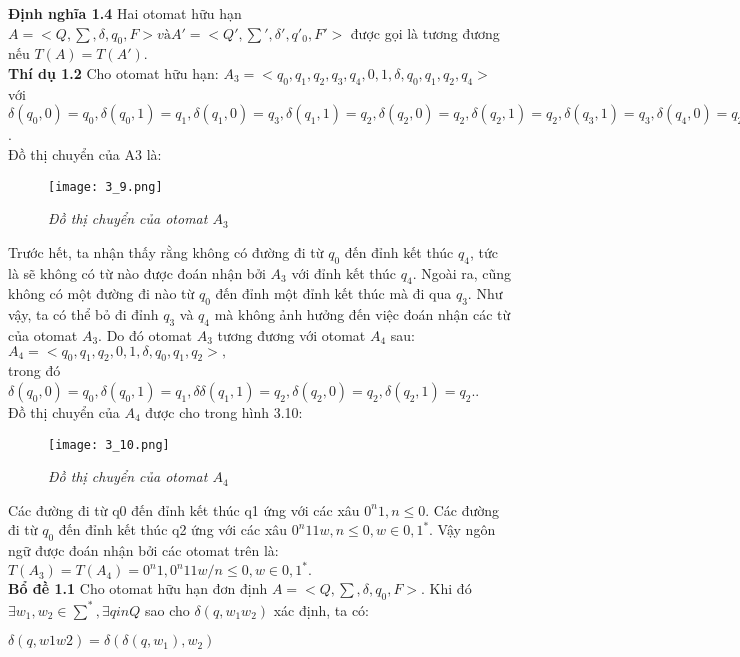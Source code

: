 \begin{flushleft}
\textbf{Định nghĩa 1.4} Hai otomat hữu hạn $A = <Q, \sum, \delta, q_0, F> và A'= <Q', \sum', \delta', q'_0, F'>$ được gọi là tương đương nếu $T(A) = T(A')$.\\
\textbf{Thí dụ 1.2} Cho otomat hữu hạn: $A_3 = <{q_0, q_1, q_2, q_3, q_4},{0, 1}, \delta, q_0, {q_1, q_2, q_4}>$ với $\delta(q_0,0) = q_0, \delta(q_0,1) = q_1, \delta(q_1,0) = q_3, \delta(q_1,1) = q_2, \delta(q_2,0) = q_2, \delta(q_2,1) = q_2, \delta(q_3,1) = q_3, \delta(q_4,0) = q_2, \delta(q_4,1) = q_3.$.\\
\hspace{10mm}Đồ thị chuyển của A3 là:\\
\begin{figure}[ht]
\texttt{[image: 3\_9.png]}
\caption{ \textit{Đồ thị chuyển của otomat $A_3$}}
\end{figure}

Trước hết, ta nhận thấy rằng không có đường đi từ $q_0$ đến đỉnh kết thúc $q_4$, tức là sẽ không có từ nào được đoán nhận bởi $A_3$ với đỉnh kết thúc $q_4$. Ngoài ra, cũng không có một đường đi nào từ $q_0$ đến đỉnh một đỉnh kết thúc mà đi qua $q_3$. Như vậy, ta có thể bỏ đi đỉnh $q_3$ và $q_4$ mà không ảnh hưởng đến việc đoán nhận các từ của otomat $A_3$. Do đó otomat $A_3$ tương đương với otomat $A_4$ sau: \\
$A_4 = <{q_0, q_1, q_2}, {0, 1}, \delta, q_0, {q_1, q_2}>,$\\
trong đó $\delta(q_0,0) = q_0, \delta(q_0,1) = q_1, \delta\delta(q_1,1) = q_2, \delta(q_2,0) = q_2, \delta(q_2,1) = q_2.$.\\
Đồ thị chuyển của $A_4$ được cho trong hình 3.10:\\
\begin{figure}[ht]
\texttt{[image: 3\_10.png]}
\caption{ \textit{Đồ thị chuyển của otomat $A_4$}}
\end{figure}
Các đường đi từ q0 đến đỉnh kết thúc q1 ứng với các xâu $0^n1, n \le 0$. Các đường đi từ $q_0$ đến đỉnh kết thúc q2 ứng với các xâu $0^n11w, n \le 0, w \in {0, 1}^*$. Vậy ngôn ngữ được đoán nhận bởi các otomat trên là: \\
$T(A_3) = T(A_4) = {0^n1, 0^n11w / n \le 0, w \in {0, 1}^*}.$ \\
\textbf{Bổ đề 1.1} Cho otomat hữu hạn đơn định $A = <Q, \sum, \delta, q_0, F>.$  Khi đó $\exists w_1, w_2 \in \sum^*, \exists q in Q$ sao cho $\delta(q, w_1w_2)$ xác định, ta có:\\
\end{flushleft}
$\delta(q, w1w2) = \delta(\delta(q, w_1), w_2)$\\
